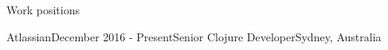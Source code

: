 \documentclass{resume} %
\begin{document}

\begin{rSection}{Work positions}

\begin{rSubsection}{Atlassian}{December 2016 - Present}{Senior Clojure Developer}{Sydney, Australia}


\end{rSubsection}
\end{rSection}
\end{document}
